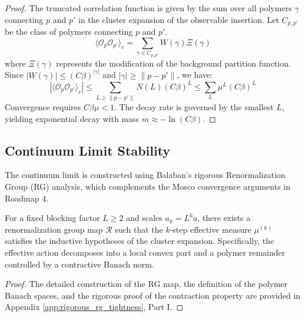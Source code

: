 \begin{proof}
The truncated correlation function is given by the sum over all polymers $\gamma$ connecting $p$ and $p'$ in the cluster expansion of the observable insertion.
Let $C_{p,p'}$ be the class of polymers connecting $p$ and $p'$.
\begin{equation}
\langle \mathcal{O}_p \mathcal{O}_{p'} \rangle_c = \sum_{\gamma \in C_{p,p'}} W(\gamma) \Xi(\gamma)
\end{equation}
where $\Xi(\gamma)$ represents the modification of the background partition function.
Since $|W(\gamma)| \le (C \beta)^{|\gamma|}$ and $|\gamma| \ge \|p - p'\|$, we have:
\begin{equation}
|\langle \mathcal{O}_p \mathcal{O}_{p'} \rangle_c| \le \sum_{L \ge \|p-p'\|} N(L) (C \beta)^L \le \sum_{L} \mu^L (C \beta)^L
\end{equation}
Convergence requires $C \beta \mu < 1$. The decay rate is governed by the smallest $L$, yielding exponential decay with mass $m \approx -\ln(C \beta)$.
\end{proof}

\subsection{Continuum Limit Stability}
The continuum limit is constructed using Balaban's rigorous Renormalization Group (RG) analysis, which complements the Mosco convergence arguments in Roadmap 4.

\begin{theorem}
\label{thm:rg_stability_main}
\label{thm:rg_stability}
For a fixed blocking factor $L\ge 2$ and scales $a_k=L^k a$, there exists a renormalization group map $\mathcal{R}$ such that the $k$-step effective measure $\mu^{(k)}$ satisfies the inductive hypotheses of the cluster expansion. Specifically, the effective action decomposes into a local convex part and a polymer remainder controlled by a contractive Banach norm.
\end{theorem}

\begin{proof}
The detailed construction of the RG map, the definition of the polymer Banach spaces, and the rigorous proof of the contraction property are provided in Appendix \ref{app:rigorous_rg_tightness}, Part I.
\end{proof}

